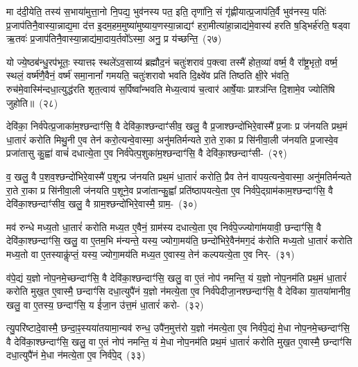 मा द॑दी॒येति॒ तस्य॑ स॒भाया॑मुत्ता॒नो नि॒पद्य॒ भुव॑नस्य पत॒ इति॒ तृणा॑नि॒ सं गृ॑ह्णीयात्प्र॒जा\-प॑ति॒र्वै भुव॑नस्य॒ पतिः॑ प्र॒जा\-प॑तिनै॒वास्या॒न्नाद्य॒मा द॑त्त इ॒दम॒हम॒मुष्या॑मुष्याय॒णस्या॒न्नाद्यꣳ॑ हरा॒मीत्या॑हा॒न्नाद्य॑मे॒वास्य॑ हरति ष॒ड्भिर्\mbox{}ह॑रति॒ षड्वा ऋ॒तवः॑ प्र॒जा\-प॑तिनै॒वास्या॒न्नाद्य॑मा॒दाय॒र्तवो᳚\-ऽस्मा॒ अनु॒ प्र य॑च्छन्ति॒~(२७)

यो ज्ये॒ष्ठब॑न्धु॒रप॑भूतः॒ स्यात्तꣴ स्थले॑\-ऽव॒साय्य॑ ब्रह्मौद॒नं चतुः॑शरावं प॒क्त्वा तस्मै॑ होत॒व्या॑ वर्ष्म॒ वै रा᳚ष्ट्र॒भृतो॒ वर्ष्म॒ स्थलं॒ वर्ष्म॑णै॒वैनं॒ वर्ष्म॑ समा॒नानां᳚ गमयति॒ चतुः॑शरावो भवति दि॒क्ष्वे॑व प्रति॑ तिष्ठति क्षी॒रे भ॑वति॒ रुच॑मे॒वास्मि॑\-न्दधा॒त्युद्ध॑रति शृत॒त्वाय॑ स॒र्पिष्वा᳚न्भवति मेध्य॒त्वाय॑ च॒त्वार॑ आर्\mbox{}षे॒याः प्राश्ञ॑न्ति दि॒शामे॒व ज्योति॑षि जुहोति॥~(२८)

{\anuvakamend[{ग्रा॒मी यु॑नक्ती॒ध्मः स्व ए॒वैना॑न॒न्नाद्यं॑ यच्छ॒न्त्येका॒न्नप॑ञ्चा॒शच्च॑}]}%

देवि॑का॒ निर्व॑पेत्प्र॒जाका॑म॒श्छन्दाꣳ॑सि॒ वै देवि॑का॒श्छन्दाꣳ॑सीव॒ खलु॒ वै प्र॒जाश्छन्दो॑भिरे॒वास्मै᳚ प्र॒जाः प्र ज॑नयति प्रथ॒मं धा॒तारं॑ करोति मिथु॒नी ए॒व तेन॑ करो॒त्यन्वे॒वास्मा॒ अनु॑मतिर्मन्यते रा॒ते रा॒का प्र सि॑नीवा॒ली ज॑नयति प्र॒जास्वे॒व प्रजा॑तासु कु॒ह्वा॑ वाचं॑ दधात्ये॒ता ए॒व निर्व॑पेत्प॒शुका॑म॒श्छन्दाꣳ॑सि॒ वै देवि॑का॒श्छन्दाꣳ॑सी-~(२९)

व॒ खलु॒ वै प॒शव॒श्छन्दो॑भिरे॒वास्मै॑ प॒शून्प्र ज॑नयति प्रथ॒मं धा॒तारं॑ करोति॒ प्रैव तेन॑ वापय॒त्यन्वे॒वास्मा॒ अनु॑मतिर्मन्यते रा॒ते रा॒का प्र सि॑नीवा॒ली ज॑नयति प॒शूने॒व प्रजा॑तान्कु॒ह्वा᳚ प्रति॑\-ष्ठापयत्ये॒ता ए॒व निर्व॑पे॒द्ग्राम॑काम॒श्छन्दाꣳ॑सि॒ वै देवि॑का॒श्छन्दाꣳ॑सीव॒ खलु॒ वै ग्राम॒श्छन्दो॑भिरे॒वास्मै॒ ग्राम॒-~(३०)

मव॑ रुन्धे मध्य॒तो धा॒तारं॑ करोति मध्य॒त ए॒वैनं॒ ग्राम॑स्य दधात्ये॒ता ए॒व निर्व॑पे॒ज्ज्योगा॑मयावी॒ छन्दाꣳ॑सि॒ वै देवि॑का॒श्छन्दाꣳ॑सि॒ खलु॒ वा ए॒तम॒भि म॑न्यन्ते॒ यस्य॒ ज्योगा॒मय॑ति॒ छन्दो॑भिरे॒वैन॑मग॒दं क॑रोति मध्य॒तो धा॒तारं॑ करोति मध्य॒तो वा ए॒तस्याकॢ॑प्तं॒ यस्य॒ ज्योगा॒मय॑ति मध्य॒त ए॒वास्य॒ तेन॑ कल्पयत्ये॒ता ए॒व निर्-~(३१)

व॑पे॒द्यं य॒ज्ञो नोप॒नमे॒च्छन्दाꣳ॑सि॒ वै देवि॑का॒श्छन्दाꣳ॑सि॒ खलु॒ वा ए॒तं नोप॑ नमन्ति॒ यं य॒ज्ञो नोप॒नम॑ति प्रथ॒मं धा॒तारं॑ करोति मुख॒त ए॒वास्मै॒ छन्दाꣳ॑सि दधा॒त्युपै॑नं य॒ज्ञो न॑मत्ये॒ता ए॒व निर्व॑पेदीजा॒नश्छन्दाꣳ॑सि॒ वै देवि॑का या॒तया॑मानीव॒ खलु॒ वा ए॒तस्य॒ छन्दाꣳ॑सि॒ य ई॑जा॒न उ॑त्त॒मं धा॒तारं॑ करो-~(३२)

त्यु॒परि॑ष्टादे॒वास्मै॒ छन्दा॒ꣴ॒स्यया॑तयामा॒न्यव॑ रुन्ध॒ उपै॑न॒मुत्त॑रो य॒ज्ञो न॑मत्ये॒ता ए॒व निर्व॑पे॒द्यं मे॒धा नोप॒नमे॒च्छन्दाꣳ॑सि॒ वै देवि॑का॒श्छन्दाꣳ॑सि॒ खलु॒ वा ए॒तं नोप॑ नमन्ति॒ यं मे॒धा नोप॒नम॑ति प्रथ॒मं धा॒तारं॑ करोति मुख॒त ए॒वास्मै॒ छन्दाꣳ॑सि दधा॒त्युपै॑नं मे॒धा न॑मत्ये॒ता ए॒व निर्व॑पे॒द्~(३३)

